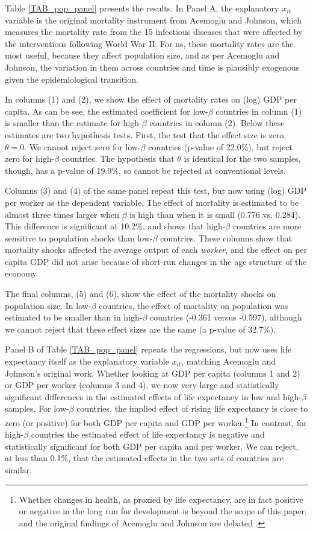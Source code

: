 \documentclass[11pt]{article}
\begin{document}
Table \ref{TAB_pop_panel} presents the results. In Panel A, the explanatory $x_{it}$ variable is the original mortality instrument from Acemoglu and Johnson, which measures the mortality rate from the 15 infectious diseases that were affected by the interventions following World War II. For us, these mortality rates are the most useful, because they affect population size, and as per Acemoglu and Johnson, the variation in them across countries and time is plausibly exogenous given the epidemiological transition. 

In columns (1) and (2), we show the effect of mortality rates on (log) GDP per capita. As can be see, the estimated coefficient for low-$\beta$ countries in column (1) is smaller than the estimate for high-$\beta$ countries in column (2). Below these estimates are two hypothesis tests. First, the test that the effect size is zero, $\theta=0$. We cannot reject zero for low-$\beta$ countries (p-value of 22.0\%), but reject zero for high-$\beta$ countries. The hypothesis that $\theta$ is identical for the two samples, though, has a p-value of 19.9\%, so cannot be rejected at conventional levels. 

Columns (3) and (4) of the same panel repeat this test, but now using (log) GDP per worker as the dependent variable. The effect of mortality is estimated to be almost three times larger when $\beta$ is high than when it is small (0.776 vs. 0.284). This difference is significant at 10.2\%, and shows that high-$\beta$ countries are more sensitive to population shocks than low-$\beta$ countries. These columns show that mortality shocks affected the average output of each \textit{worker}, and the effect on per capita GDP did not arise because of short-run changes in the age structure of the economy.

The final columns, (5) and (6), show the effect of the mortality shocks on population size. In low-$\beta$ countries, the effect of mortality on population was estimated to be smaller than in high-$\beta$ countries (-0.361 versus -0.597), although we cannot reject that these effect sizes are the same (a p-value of 32.7\%). 

Panel B of Table \ref{TAB_pop_panel} repeats the regressions, but now uses life expectancy itself as the explanatory variable $x_{it}$, matching Acemoglu and Johnson's original work. Whether looking at GDP per capita (columns 1 and 2) or GDP per worker (columns 3 and 4), we now very large and statistically significant differences in the estimated effects of life expectancy in low and high-$\beta$ samples. For low-$\beta$ countries, the implied effect of rising life expectancy is close to zero (or positive) for both GDP per capita and GDP per worker.\footnote{Whether changes in health, as proxied by life expectancy, are in fact positive or negative in the long run for development is beyond the scope of this paper, and the original findings of Acemoglu and Johnson are debated \citep{bcf2014}.} In contrast, for high-$\beta$ countries the estimated effect of life expectancy is negative and statistically significant for both GDP per capita and per worker. We can reject, at less than 0.1\%, that the estimated effects in the two sets of countries are similar. 
\end{document}
